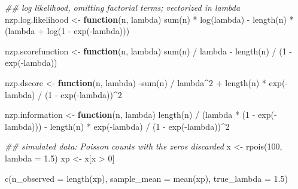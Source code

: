 \documentclass[
  letterpaper,
  DIV=11,
  numbers=noendperiod]{scrreprt}
\newenvironment{Shaded}{\begin{snugshade}}{\end{snugshade}}
\newcommand{\AttributeTok}[1]{\textcolor[rgb]{0.40,0.45,0.13}{#1}}
\newcommand{\ControlFlowTok}[1]{\textcolor[rgb]{0.00,0.23,0.31}{\textbf{#1}}}
\newcommand{\DecValTok}[1]{\textcolor[rgb]{0.68,0.00,0.00}{#1}}
\newcommand{\DocumentationTok}[1]{\textcolor[rgb]{0.37,0.37,0.37}{\textit{#1}}}
\newcommand{\FloatTok}[1]{\textcolor[rgb]{0.68,0.00,0.00}{#1}}
\newcommand{\FunctionTok}[1]{\textcolor[rgb]{0.28,0.35,0.67}{#1}}
\newcommand{\NormalTok}[1]{\textcolor[rgb]{0.00,0.23,0.31}{#1}}
\newcommand{\OtherTok}[1]{\textcolor[rgb]{0.00,0.23,0.31}{#1}}
\newcommand{\SpecialCharTok}[1]{\textcolor[rgb]{0.37,0.37,0.37}{#1}}
\begin{document}
\begin{Shaded}
\begin{Highlighting}[]
\DocumentationTok{\#\# log likelihood, omitting factorial terms; vectorized in lambda}
\NormalTok{nzp.log.likelihood }\OtherTok{\textless{}{-}} \ControlFlowTok{function}\NormalTok{(n, lambda)}
  \FunctionTok{sum}\NormalTok{(n) }\SpecialCharTok{*} \FunctionTok{log}\NormalTok{(lambda) }\SpecialCharTok{{-}} \FunctionTok{length}\NormalTok{(n) }\SpecialCharTok{*}\NormalTok{ (lambda }\SpecialCharTok{+} \FunctionTok{log}\NormalTok{(}\DecValTok{1} \SpecialCharTok{{-}} \FunctionTok{exp}\NormalTok{(}\SpecialCharTok{{-}}\NormalTok{lambda)))}

\NormalTok{nzp.scorefunction }\OtherTok{\textless{}{-}} \ControlFlowTok{function}\NormalTok{(n, lambda)}
  \FunctionTok{sum}\NormalTok{(n) }\SpecialCharTok{/}\NormalTok{ lambda }\SpecialCharTok{{-}} \FunctionTok{length}\NormalTok{(n) }\SpecialCharTok{/}\NormalTok{ (}\DecValTok{1} \SpecialCharTok{{-}} \FunctionTok{exp}\NormalTok{(}\SpecialCharTok{{-}}\NormalTok{lambda))}

\NormalTok{nzp.dscore }\OtherTok{\textless{}{-}} \ControlFlowTok{function}\NormalTok{(n, lambda)}
  \SpecialCharTok{{-}}\FunctionTok{sum}\NormalTok{(n) }\SpecialCharTok{/}\NormalTok{ lambda}\SpecialCharTok{\^{}}\DecValTok{2} \SpecialCharTok{+} \FunctionTok{length}\NormalTok{(n) }\SpecialCharTok{*} \FunctionTok{exp}\NormalTok{(}\SpecialCharTok{{-}}\NormalTok{lambda) }\SpecialCharTok{/}\NormalTok{ (}\DecValTok{1} \SpecialCharTok{{-}} \FunctionTok{exp}\NormalTok{(}\SpecialCharTok{{-}}\NormalTok{lambda))}\SpecialCharTok{\^{}}\DecValTok{2}

\NormalTok{nzp.information }\OtherTok{\textless{}{-}} \ControlFlowTok{function}\NormalTok{(n, lambda)}
  \FunctionTok{length}\NormalTok{(n) }\SpecialCharTok{/}\NormalTok{ (lambda }\SpecialCharTok{*}\NormalTok{ (}\DecValTok{1} \SpecialCharTok{{-}} \FunctionTok{exp}\NormalTok{(}\SpecialCharTok{{-}}\NormalTok{lambda))) }\SpecialCharTok{{-}} \FunctionTok{length}\NormalTok{(n) }\SpecialCharTok{*} \FunctionTok{exp}\NormalTok{(}\SpecialCharTok{{-}}\NormalTok{lambda) }\SpecialCharTok{/}\NormalTok{ (}\DecValTok{1} \SpecialCharTok{{-}} \FunctionTok{exp}\NormalTok{(}\SpecialCharTok{{-}}\NormalTok{lambda))}\SpecialCharTok{\^{}}\DecValTok{2}

\DocumentationTok{\#\# simulated data: Poisson counts with the zeros discarded}
\NormalTok{x }\OtherTok{\textless{}{-}} \FunctionTok{rpois}\NormalTok{(}\DecValTok{100}\NormalTok{, }\AttributeTok{lambda =} \FloatTok{1.5}\NormalTok{)}
\NormalTok{xp }\OtherTok{\textless{}{-}}\NormalTok{ x[x }\SpecialCharTok{\textgreater{}} \DecValTok{0}\NormalTok{]}

\FunctionTok{c}\NormalTok{(}\AttributeTok{n\_observed =} \FunctionTok{length}\NormalTok{(xp), }\AttributeTok{sample\_mean =} \FunctionTok{mean}\NormalTok{(xp), }\AttributeTok{true\_lambda =} \FloatTok{1.5}\NormalTok{)}
\end{Highlighting}
\end{Shaded}
\end{document}
